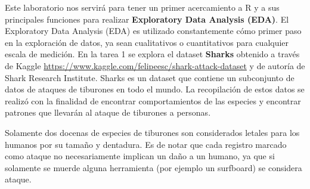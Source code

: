 \documentclass{oxmathproblems}
\begin{document}
Este laboratorio nos servirá para tener un primer acercamiento a R y a sus principales funciones para realizar \textbf{Exploratory Data Analysis (EDA)}. El Exploratory Data Analysis (EDA) es utilizado constantemente cómo primer paso en la exploración de datos, ya sean cualitativos o cuantitativos para cualquier escala de medición. En la tarea 1 se explora el dataset \textbf{Sharks} obtenido a través de Kaggle \href{https://www.kaggle.com/felipeesc/shark-attack-dataset}{https://www.kaggle.com/felipeesc/shark-attack-dataset} y de autoría de Shark Research Institute. Sharks es un dataset que contiene un subconjunto de datos de ataques de tiburones en todo el mundo. La recopilación de estos datos se realizó con la finalidad de encontrar comportamientos de las especies y encontrar patrones que llevarán al ataque de tiburones a personas.

Solamente dos docenas de especies de tiburones son considerados letales para los humanos por su tamaño y dentadura. Es de notar que cada registro marcado como ataque no necesariamente implican un daño a un humano, ya que si solamente se muerde alguna herramienta (por ejemplo un surfboard) se considera ataque. 
\end{document}
